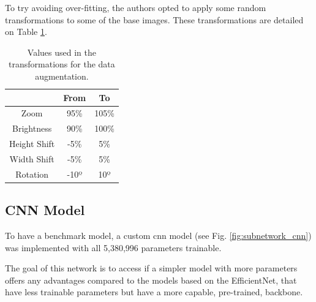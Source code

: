 \documentclass[conference]{IEEEtran}
\begin{document}
To try avoiding over-fitting, the authors opted to apply some random transformations to some of the base images. These transformations are detailed on Table \ref{tab:data_augment}.

\begin{table}[htp]
\centering
\caption{Values used in the transformations for the data augmentation.}
\label{tab:data_augment}
\begin{tabular}{ccc}
             & From & To   \\ \hline
Zoom         & 95\%  & 105\% \\
Brightness   & 90\%  & 100\% \\
Height Shift & -5\%  & 5\%   \\
Width Shift  & -5\%  & 5\%   \\
Rotation     & -10º & 10º 
\end{tabular}
\end{table}

\subsection{CNN Model}

To have a benchmark model, a custom \gls{cnn} model (see Fig. \ref{fig:subnetwork_cnn}) was implemented with all 5,380,996 parameters trainable. 

The goal of this network is to access if a simpler model with more parameters offers any advantages compared to the models based on the EfficientNet, that have less trainable parameters but have a more capable, pre-trained, backbone. 
\end{document}
